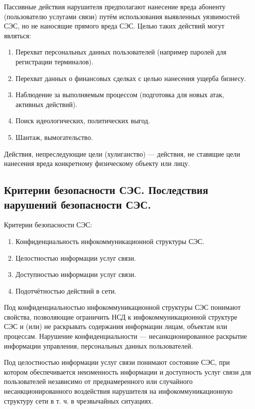 \documentclass[12pt, russian, oneside, article]{ncc}
\begin{document}
Пассивные действия нарушителя предполагают нанесение вреда абоненту (пользователю услугами связи) путём использования выявленных уязвимостей СЭС, но не наносящие прямого вреда СЭС. Целью таких действий могут являться:
\begin{enumerate}
\item Перехват персональных данных пользователей (например паролей для регистрации терминалов).
\item Перехват данных о финансовых сделках с целью нанесения ущерба бизнесу.
\item Наблюдение за выполняемым процессом (подготовка для новых атак, активных действий).
\item Поиск идеологических, политических выгод.
\item Шантаж, вымогательство.
\end{enumerate}

Действия, непреследующие цели (хулиганство) --- действия, не ставящие цели нанесения вреда конкретному физическому объекту или лицу.
\subsection{Критерии безопасности СЭС. Последствия нарушений безопасности СЭС.}
\label{sec-1_3}


Критерии безопасности СЭС:
\begin{enumerate}
\item Конфиденциальность инфокоммуникационной структуры СЭС.
\item Целостностью информации услуг связи.
\item Доступностью информации услуг связи.
\item Подотчётностью действий в сети.
\end{enumerate}

Под конфиденциальностью инфокоммуникационной структуры СЭС понимают свойства, позволяющие ограничить НСД к инфокоммуникационной структуре СЭС и (или) не раскрывать содержания информации лицам, объектам или процессам. Нарушение конфиденциальности --- несанкционированное раскрытие информации управления, персональных данных пользователей.

Под целостностью информации услуг связи понимают состояние СЭС, при котором обеспечивается неизменность информации и доступность услуг связи для пользователей независимо от преднамеренного или случайного несанкционированного воздействия нарушителя на инфокоммуникационную структуру сети в т. ч. в чрезвычайных ситуациях.
\end{document}
